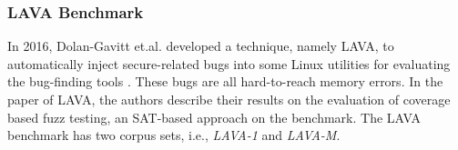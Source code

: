 \subsubsection{LAVA Benchmark}
\noindent In 2016, Dolan-Gavitt et.al. developed a technique, namely LAVA, to automatically inject secure-related bugs into some Linux utilities for evaluating the bug-finding tools \cite{dolan2016lava}. These bugs are all hard-to-reach memory errors. In the paper of LAVA, the authors describe their results on the evaluation of coverage based fuzz testing, an SAT-based approach on the benchmark. The LAVA benchmark has two corpus sets, i.e., \textit{LAVA-1} and \textit{LAVA-M}.

